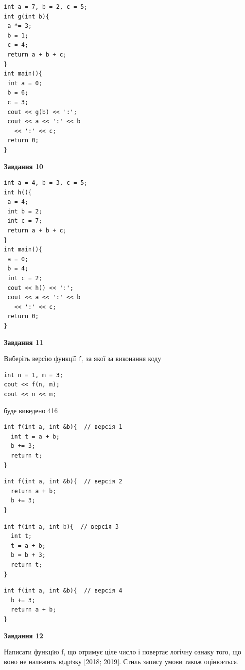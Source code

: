\documentclass[12pt, ukrainian]{article}
\def\code#1{\Verb!#1!}
\begin{document}
{\begin {large}
\begin{minipage}[t]{7.0cm}
\begin{verbatim}
int a = 7, b = 2, c = 5;
int g(int b){
 a *= 3;
 b = 1;
 c = 4;
 return a + b + c;
}
int main(){
 int a = 0;
 b = 6;
 c = 3;
 cout << g(b) << ':';
 cout << a << ':' << b 
   << ':' << c;
 return 0;
}
\end{verbatim}



\begin{center}
\textbf{Завдання 10}
\end{center}
\vspace{-8mm}

\begin{verbatim}
int a = 4, b = 3, c = 5;
int h(){
 a = 4;
 int b = 2;
 int c = 7;
 return a + b + c;
}
int main(){
 a = 0;
 b = 4;
 int c = 2;
 cout << h() << ':';
 cout << a << ':' << b 
   << ':' << c;
 return 0;
}
\end{verbatim}

\end{minipage}
\vline \hspace{1mm}
\begin{minipage}[t]{11.0cm}

\begin{center}
\textbf{Завдання 11}
\end{center}
Виберіть версію функції \code{f}, за якої за виконання коду
\begin{verbatim}
int n = 1, m = 3;
cout << f(n, m);
cout << n << m;
\end{verbatim}

буде виведено 416

\begin{verbatim}
int f(int a, int &b){  // версія 1
  int t = a + b;
  b += 3;
  return t;
}
\end{verbatim}

\vspace{-8mm}\begin{verbatim}
int f(int a, int &b){  // версія 2
  return a + b;
  b += 3;
}
\end{verbatim}

\vspace{-8mm}\begin{verbatim}
int f(int a, int b){  // версія 3
  int t;
  t = a + b;
  b = b + 3;
  return t;
}
\end{verbatim}

\vspace{-8mm}\begin{verbatim}
int f(int a, int &b){  // версія 4
  b += 3;
  return a + b;
}
\end{verbatim}



\begin{center}
\textbf{Завдання 12}
\end{center}

Написати функцiю f, що отримує ціле число і повертає логічну ознаку того, що воно не належить вiдрiзку [2018; 2019]. Стиль запису умови також оцінюється.\par

\end{minipage}

\end {large}}
\newpage
\end{document}
